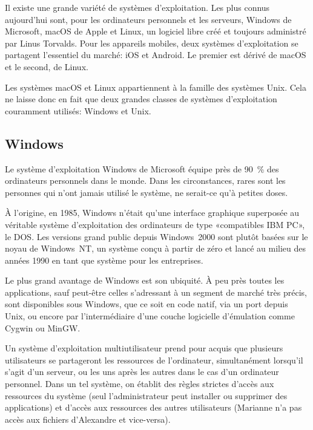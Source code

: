 Il existe une grande variété de systèmes d'exploitation. Les plus
connus aujourd'hui sont, pour les ordinateurs personnels et les
serveurs, Windows de Microsoft, macOS de Apple et Linux, un logiciel
libre créé et toujours administré par Linus Torvalds. Pour les
appareils mobiles, deux systèmes d'exploitation se partagent
l'essentiel du marché: iOS et Android. Le premier est dérivé de macOS
et le second, de Linux.

Les systèmes macOS et Linux appartiennent à la famille des systèmes
Unix. Cela ne laisse donc en fait que deux grandes classes
de systèmes d'exploitation couramment utilisés: Windows et Unix.

\subsection{Windows}
\label{sec:informatique:os:windows}

Le système d'exploitation Windows de Microsoft équipe
près de 90~\% des ordinateurs personnels dans le monde. Dans les
circonstances, rares sont les personnes qui n'ont jamais utilisé le
système, ne serait-ce qu'à petites doses.

À l'origine, en 1985, Windows n'était qu'une interface graphique
superposée au véritable système d'exploitation des ordinateurs de type
«compatibles IBM PC», le DOS. Les versions grand public depuis
Windows~2000 sont plutôt basées sur le noyau de Windows~NT, un système
conçu à partir de zéro et lancé au milieu des années 1990 en tant que
système pour les entreprises.

Le plus grand avantage de Windows est son ubiquité. À peu près toutes
les applications, sauf peut-être celles s'adressant à un segment de
marché très précis, sont disponibles sous Windows, que ce soit en code
natif, via un port depuis Unix, ou encore par
l'intermédiaire d'une couche logicielle d'émulation comme Cygwin ou
MinGW.

Un système d'exploitation multiutilisateur prend pour acquis que
plusieurs utilisateurs se partageront les ressources de l'ordinateur,
simultanément lorsqu'il s'agit d'un serveur, ou les uns après les
autres dans le cas d'un ordinateur personnel. Dans un tel système, on
établit des règles strictes d'accès aux ressources du système (seul
l'administrateur peut installer ou supprimer des applications) et
d'accès aux ressources des autres utilisateurs (Marianne n'a pas
accès aux fichiers d'Alexandre et vice-versa).

